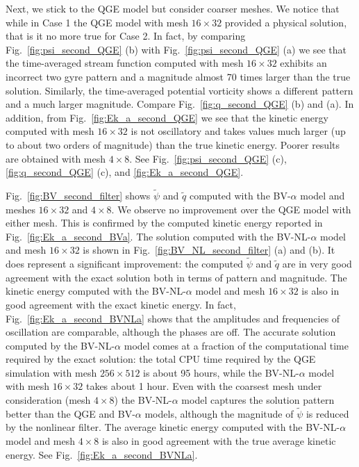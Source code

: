 \documentclass[11pt,a4paper]{article}
\begin{document}
Next, we stick to the QGE model but consider coarser meshes. 
We notice that while in Case 1 the QGE model with mesh $16 \times 32$
provided a physical solution, that is it no more true for Case 2. In fact, by comparing
Fig.~\ref{fig:psi_second_QGE} (b) with Fig.~\ref{fig:psi_second_QGE} (a) 
we see that the time-averaged stream function computed with mesh $16 \times 32$
exhibits an incorrect two gyre pattern and a magnitude almost 70 times larger than the true solution. 
Similarly, the time-averaged potential vorticity shows a different pattern and a much larger magnitude.
Compare Fig.~\ref{fig:q_second_QGE} (b) and (a). In addition, from Fig.~\ref{fig:Ek_a_second_QGE}
we see that the kinetic energy computed with mesh $16 \times 32$ is not oscillatory 
and takes values much larger (up to about two orders of magnitude) than the true kinetic energy.
Poorer results are obtained with mesh $4 \times 8$. 
See Fig.~\ref{fig:psi_second_QGE} (c), \ref{fig:q_second_QGE} (c), and \ref{fig:Ek_a_second_QGE}.


Fig.~\ref{fig:BV_second_filter} shows $\widetilde{\psi}$ and $\widetilde{q}$ computed with the BV-$\alpha$ model
and meshes $16 \times 32$ and  $4 \times 8$.
We observe no improvement over the QGE model with either mesh. 
This is confirmed by the computed kinetic energy reported in Fig.~\ref{fig:Ek_a_second_BVa}.
The solution computed with  the BV-NL-$\alpha$ model and mesh $16 \times 32$ is
shown in Fig.~\ref{fig:BV_NL_second_filter} (a) and (b). It 
does represent a significant improvement: 
the computed $\widetilde{\psi}$ and $\widetilde{q}$  are in very good agreement with the exact solution
both in terms of pattern and magnitude. 
The kinetic energy computed with  the BV-NL-$\alpha$ model and mesh $16 \times 32$ is also in good agreement
with the exact kinetic energy. In fact, Fig.~\ref{fig:Ek_a_second_BVNLa} shows that the amplitudes and frequencies
of oscillation are comparable, although the phases are off. The accurate solution
computed by the BV-NL-$\alpha$ model comes at a fraction of the computational time required
by the exact solution: the total CPU time required by the QGE simulation with mesh $256 \times 512$ is about 95 hours, 
while the BV-NL-$\alpha$ model with mesh $16 \times 32$ takes about 1 hour. %
Even with the coarsest mesh under consideration (mesh $4 \times 8$) the BV-NL-$\alpha$ model captures
the solution pattern better than the QGE and BV-$\alpha$ models, although the magnitude of $\widetilde{\psi}$ is reduced
by the nonlinear filter. The average kinetic energy computed with the BV-NL-$\alpha$ model and mesh
$4 \times 8$ is also in good agreement with the true average kinetic energy. See Fig.~\ref{fig:Ek_a_second_BVNLa}.
\end{document}
